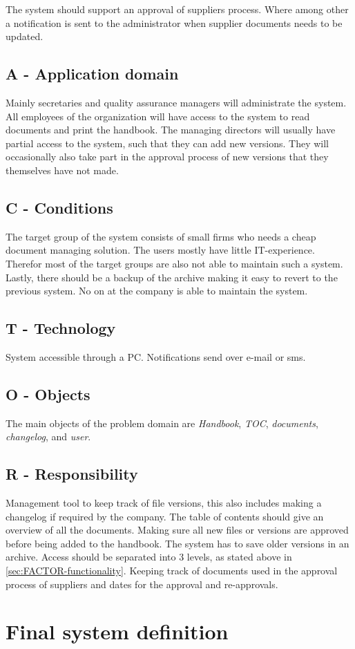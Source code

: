The system should support an approval of suppliers process.
Where among other a notification is sent to the administrator when supplier documents needs to be updated. 

\subsection{A - Application domain}
Mainly secretaries and quality assurance managers will administrate the system. 
All employees of the organization will have access to the system to read documents and print the handbook. 
The managing directors will usually have partial access to the system, such that they can add new versions. 
They will occasionally also take part in the approval process of new versions that they themselves have not made.

\subsection{C - Conditions}
The target group of the system consists of small firms who needs a cheap document managing solution. 
The users mostly have little IT-experience.
Therefor most of the target groups are also not able to maintain such a system.
Lastly, there should be a backup of the archive making it easy to revert to the previous system.
No on at the company is able to maintain the system.

\subsection{T - Technology}
System accessible through a PC.
Notifications send over e-mail or sms.

\subsection{O - Objects}
The main objects of the problem domain are \textit{Handbook}, \textit{TOC}, \textit{documents}, \textit{changelog}, and \textit{user}.

\subsection{R  - Responsibility}
Management tool to keep track of file versions, this also includes making a changelog if required by the company.
The table of contents should give an overview of all the documents. 
Making sure all new files or versions are approved before being added to the handbook.
The system has to save older versions in an archive. 
Access should be separated into 3 levels, as stated above in \cref{sec:FACTOR-functionality}. 
Keeping track of documents used in the approval process of suppliers and dates for the approval and re-approvals. 

\section{Final system definition}

